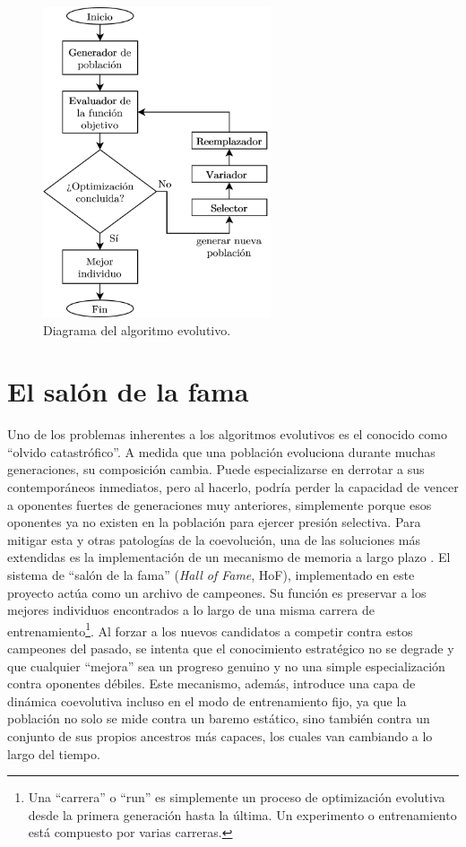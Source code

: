 \begin{figure}[H]
	\centering
	\includegraphics[width=0.6\textwidth]{img/diagrama_algoritmo.png}
	\caption{Diagrama del algoritmo evolutivo.}
	\label{fig:diagrama_algoritmo}
\end{figure}

\section{El salón de la fama} \label{sec:salon_fama}

Uno de los problemas inherentes a los algoritmos evolutivos es el conocido como ``olvido catastrófico''. A medida que una población evoluciona durante muchas generaciones, su composición cambia. Puede especializarse en derrotar a sus contemporáneos inmediatos, pero al hacerlo, podría perder la capacidad de vencer a oponentes fuertes de generaciones muy anteriores, simplemente porque esos oponentes ya no existen en la población para ejercer presión selectiva. Para mitigar esta y otras patologías de la coevolución, una de las soluciones más extendidas es la implementación de un mecanismo de memoria a largo plazo \cite{mariela_nogueira_analysis_2013}. El sistema de ``salón de la fama'' (\textit{Hall of Fame}, HoF), implementado en este proyecto actúa como un archivo de campeones. Su función es preservar a los mejores individuos encontrados a lo largo de una misma carrera de entrenamiento\footnote{Una ``carrera'' o ``run'' es simplemente un proceso de optimización evolutiva desde la primera generación hasta la última. Un experimento o entrenamiento está compuesto por varias carreras.}. Al forzar a los nuevos candidatos a competir contra estos campeones del pasado, se intenta que el conocimiento estratégico no se degrade y que cualquier ``mejora'' sea un progreso genuino y no una simple especialización contra oponentes débiles. Este mecanismo, además, introduce una capa de dinámica coevolutiva incluso en el modo de entrenamiento fijo, ya que la población no solo se mide contra un baremo estático, sino también contra un conjunto de sus propios ancestros más capaces, los cuales van cambiando a lo largo del tiempo.

